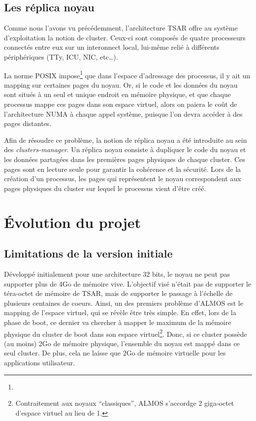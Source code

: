       
    \subsection{Les réplica noyau}

      Comme nous l'avons vu précédemment, l'architecture TSAR offre au système
      d'exploitation la notion de cluster. Ceux-ci sont composés de quatre
      processeurs connectés entre eux sur un interonnect local, lui-même relié à
      différents périphériques (TTy, ICU, NIC, etc\ldots).
      
      La norme POSIX impose\footnote{} que dans l'espace
      d'adressage des processus, il y ait un mapping sur certaines pages du
      noyau. Or, si le code et les données du noyau sont situés à un seul et
      unique endroit en mémoire physique, et que chaque processus mappe ces
      pages dans son espace virtuel, alors on paiera le coût de l'architecture
      NUMA à chaque appel système, puisque l'on devra accéder à des pages
      distantes.

      Afin de résoudre ce problème, la notion de réplica noyau a été introduite
      au sein des \textit{clusters-manager}. Un réplica noyau consiste à
      dupliquer le code du noyau et les données partagées dans les premières
      pages physiques de chaque cluster. Ces pages sont en lecture seule pour
      garantir la cohérence et la sécurité. Lors de la création d'un processus,
      les pages qui représentent le noyau correspondent aux pages physiques du
      cluster sur lequel le processus vient d'être créé.


  \section{Évolution du projet}

    \subsection{Limitations de la version initiale}
    
      Développé initialement pour une architecture 32 bits, le noyau ne peut pas
      supporter plus de 4Go de mémoire vive. L'objectif visé n'était pas de
      supporter le téra-octet de mémoire de TSAR, mais de supporter le passage à
      l'échelle de plusieurs centaines de coeurs. Ainsi, un des premiers
      problème d'ALMOS est le mapping de l'espace virtuel, qui se révèle être
      très simple. En effet, lors de la phase de boot, ce dernier va chercher à
      mapper le maximum de la mémoire physique du cluster de boot dans son
      espace virtuel\footnote{Contraitement aux noyaux ``classiques'', ALMOS
        s'accordge 2 giga-octet d'espace virtuel au lieu de 1.}. Donc, si ce
      cluster possède (au moins) 2Go de mémoire physique, l'ensemble du noyau
      est mappé dans ce seul cluster. De plus, cela ne laisse que 2Go de mémoire
      virtuelle pour les applications utilisateur.

